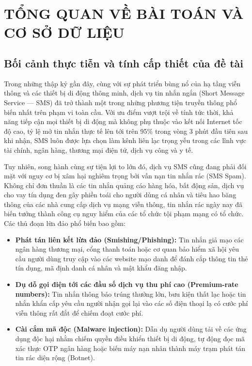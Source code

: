 \chapter{TỔNG QUAN VỀ BÀI TOÁN VÀ CƠ SỞ DỮ LIỆU}
\label{chap:chuong1}

\section{Bối cảnh thực tiễn và tính cấp thiết của đề tài}
\label{sec:boi-canh}

Trong những thập kỷ gần đây, cùng với sự phát triển bùng nổ của hạ tầng viễn thông và các thiết bị di động thông minh, dịch vụ tin nhắn ngắn (Short Message Service --- SMS) đã trở thành một trong những phương tiện truyền thông phổ biến nhất trên phạm vi toàn cầu. Với ưu điểm vượt trội về tính tức thời, khả năng tiếp cận mọi thiết bị di động mà không phụ thuộc vào kết nối Internet tốc độ cao, tỷ lệ mở tin nhắn thực tế lên tới trên 95\% trong vòng 3 phút đầu tiên sau khi nhận, SMS luôn được lựa chọn làm kênh liên lạc trọng yếu trong các lĩnh vực tài chính, ngân hàng, thương mại điện tử, dịch vụ công và y tế.

Tuy nhiên, song hành cùng sự tiện lợi to lớn đó, dịch vụ SMS cũng đang phải đối mặt với nguy cơ bị xâm hại nghiêm trọng bởi vấn nạn tin nhắn rác (SMS Spam). Không chỉ đơn thuần là các tin nhắn quảng cáo hàng hóa, bất động sản, dịch vụ cho vay tín dụng đen gây phiền toái cho người dùng cá nhân và tiêu hao băng thông của các nhà cung cấp dịch vụ mạng viễn thông, tin nhắn rác ngày nay đã biến tướng thành công cụ nguy hiểm của các tổ chức tội phạm mạng có tổ chức. Các thủ đoạn lừa đảo phổ biến bao gồm:
\begin{itemize}
    \item \textbf{Phát tán liên kết lừa đảo (Smishing/Phishing):} Tin nhắn giả mạo các ngân hàng thương mại, cổng thanh toán hoặc cơ quan bảo hiểm xã hội yêu cầu người dùng truy cập vào các website mạo danh để đánh cắp thông tin thẻ tín dụng, mã định danh cá nhân và mật khẩu đăng nhập.
    \item \textbf{Dụ dỗ gọi điện tới các đầu số dịch vụ thu phí cao (Premium-rate numbers):} Tin nhắn thông báo trúng thưởng lớn, bưu kiện thất lạc hoặc tin nhắn khẩn cấp yêu cầu người nhận gọi lại vào các số điện thoại lạ có cước phí viễn thông rất đắt để chiếm đoạt cước phí.
    \item \textbf{Cài cắm mã độc (Malware injection):} Dẫn dụ người dùng tải về các ứng dụng độc hại nhằm chiếm quyền điều khiển thiết bị di động, tự động đọc mã xác thực OTP ngân hàng hoặc biến máy nạn nhân thành máy trạm phát tán tin rác diện rộng (Botnet).
\end{itemize}

